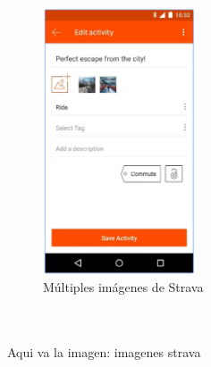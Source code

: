 \documentclass[a4paper, 11pt]{article}
\begin{document}
\begin{figure}[H]
                        \includegraphics[width=0.4\textwidth]{strava4}
                          \caption{Múltiples imágenes de Strava}
                          \label{f:strava}
                      \end{figure}
                      \\\\\textcolor[rgb]{1,0,0}{Aqui va la imagen: imagenes strava}\\\\
\end{document}
